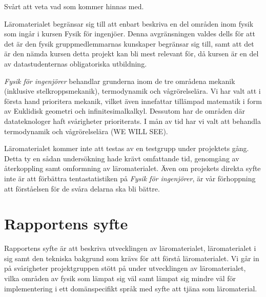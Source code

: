 \begin{draft}

Svårt att veta vad som kommer hinnas med.

Läromaterialet begränsar sig till att enbart beskriva en del områden inom fysik som ingår i kursen Fysik för ingenjöer. Denna avgränsningen valdes dells för att det är den fysik gruppmedlemmarnas kunskaper begränsar sig till, samt att det är den nämda kursen detta projekt kan bli mest relevant för, då kursen är en del av datastudenternas obligatoriska utbildning.

\textit{Fysik för ingenjörer} behandlar grunderna inom de tre områdena mekanik (inklusive stelkroppsmekanik), termodynamik och vågrörelselära. Vi har valt att i första hand prioritera mekanik, vilket även innefattar tillämpad matematik i form av Euklidisk geometri och infinitesimalkalkyl. Dessutom har de områden där datateknologer haft svårigheter prioriterats. I mån av tid har vi valt att behandla termodynamik och vågrörelselära (WE WILL SEE). 

 
Läromaterialet kommer inte att testas av en testgrupp under projektets gång. Detta ty en sådan undersökning hade krävt omfattande tid, genomgång av återkoppling samt omformning av läromaterialet. Även om projekets direkta syfte inte är att förbättra tentastatistiken på \textit{Fysik för ingenjörer}, är vår förhoppning att förståelsen för de svåra delarna ska bli bättre.
\end{draft}


\section{Rapportens syfte}

\begin{draft}
Rapportens syfte är att beskriva utvecklingen av läromaterialet, läromaterialet
i sig samt den tekniska bakgrund som krävs för att förstå läromaterialet. Vi går in på
svårigheter projektgruppen stött på under utvecklingen av läromaterialet, vilka områden
av fysik som lämpat sig väl samt lämpat sig mindre väl för implementering i ett 
domänspecifikt språk med syfte att tjäna som läromaterial.

\end{draft}
